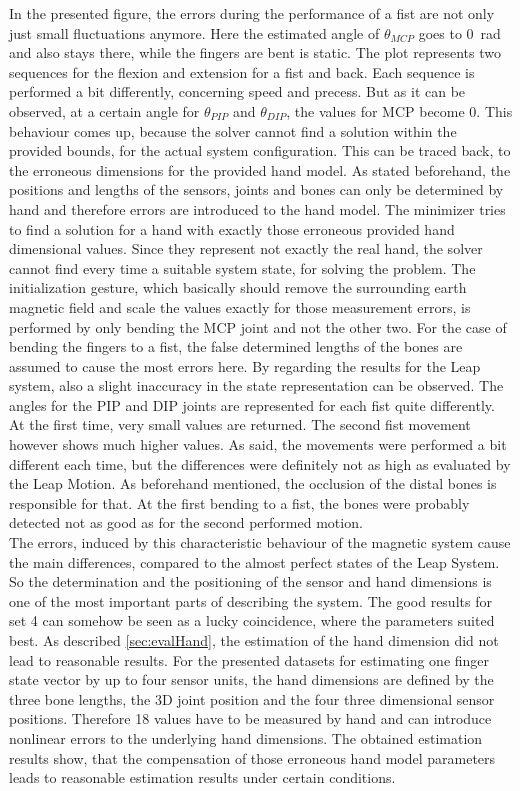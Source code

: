 In the presented figure, the errors during the performance of a fist are not only just small fluctuations anymore. Here the estimated angle of $ \theta_{MCP} $ goes to \SI{0}{\radian} and also stays there, while the fingers are bent is static. The plot represents two sequences for the flexion and extension for a fist and back. Each sequence is performed a bit differently, concerning speed and precess. But as it can be observed, at a certain angle for $ \theta_{PIP} $ and $ \theta_{DIP} $, the values for \ac{MCP} become 0. This behaviour comes up, because the solver cannot find a solution within the provided bounds, for the actual system configuration. This can be traced back, to the erroneous dimensions for the provided hand model. As stated beforehand, the positions and lengths of the sensors, joints and bones can only be determined by hand and therefore errors are introduced to the hand model. The minimizer tries to find a solution for a hand with exactly those erroneous provided hand dimensional values. Since they represent not exactly the real hand, the solver cannot find every time a suitable system state, for solving the problem. The initialization gesture, which basically should remove the surrounding earth magnetic field and scale the values exactly for those measurement errors, is performed by only bending the \ac{MCP} joint and not the other two. For the case of bending the fingers to a fist, the false determined lengths of the bones are assumed to cause the most errors here. By regarding the results for the Leap system, also a slight inaccuracy in the state representation can be observed. The angles for the \ac{PIP} and \ac{DIP} joints are represented for each fist quite differently. At the first time, very small values are returned. The second fist movement however shows much higher values. As said, the movements were performed a bit different each time, but the differences were definitely not as high as evaluated by the Leap Motion. As beforehand mentioned, the occlusion of the distal bones is responsible for that. At the first bending to a fist, the bones were probably detected not as good as for the second performed motion. \\
The errors, induced by this characteristic behaviour of the magnetic system cause the main differences, compared to the almost perfect states of the Leap System. So the determination and the positioning of the sensor and hand dimensions is one of the most important parts of describing the system. The good results for set 4 can somehow be seen as a lucky coincidence, where the parameters suited best. As described \ref{sec:evalHand}, the estimation of the hand dimension did not lead to reasonable results. For the presented datasets for estimating one finger state vector by up to four sensor units, the hand dimensions are defined by the three bone lengths, the 3D joint position and the four three dimensional sensor positions. Therefore 18 values have to be measured by hand and can introduce nonlinear errors to the underlying hand dimensions. The obtained estimation results show, that the compensation of those erroneous hand model parameters leads to reasonable estimation results under certain conditions.

